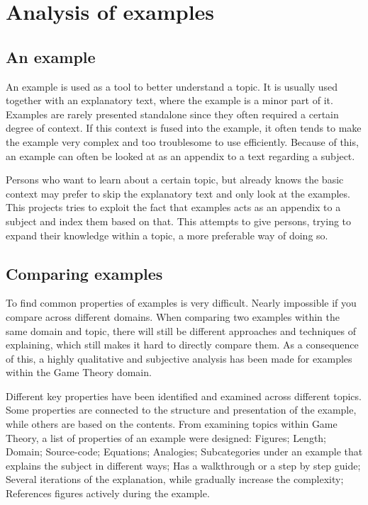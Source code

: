 \section{Analysis of examples} %

\subsection{An example}

An example is used as a tool to better understand a topic. It is usually used together with an explanatory text, where the example is a minor part of it. Examples are rarely presented standalone since they often required a certain degree of context. If this context is fused into the example, it often tends to make the example very complex and too troublesome to use efficiently. Because of this, an example can often be looked at as an appendix to a text regarding a subject. 


Persons who want to learn about a certain topic, but already knows the basic context may prefer to skip the explanatory text and only look at the examples. This projects tries to exploit the fact that examples acts as an appendix to a subject and index them based on that. This attempts to give persons, trying to expand their knowledge within a topic, a more preferable way of doing so.

\subsection{Comparing examples} \label{comparing_examples}

To find common properties of examples is very difficult. Nearly impossible if you compare across different domains. When comparing two examples within the same domain and topic, there will still be different approaches and techniques of explaining, which still makes it hard to directly compare them. As a consequence of this, a highly qualitative and subjective analysis has been made for examples within the Game Theory domain. 

Different key properties have been identified and examined across different topics. Some properties are connected to the structure and presentation of the example, while others are based on the contents. From examining topics within Game Theory, a list of properties of an example were designed: Figures; Length; Domain; Source-code; Equations; Analogies; Subcategories under an example that explains the subject in different ways; Has a walkthrough or a step by step guide; Several iterations of the explanation, while gradually increase the complexity; References figures actively during the example.

